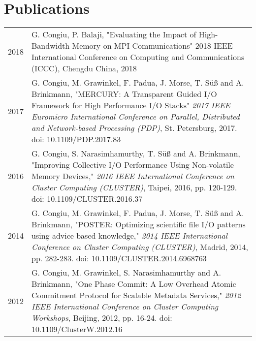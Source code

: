 \documentclass[a4paper,10pt]{article}
\begin{document}
\section{Publications}
\begin{tabular}{rp{11cm}}
        2018 & G. Congiu, P. Balaji, "Evaluating the Impact of High-Bandwidth Memory on MPI %
        Communications" 2018 IEEE International Conference on Computing and Communications (ICCC), %
        Chengdu China, 2018\\
        2017 & G. Congiu, M. Grawinkel, F. Padua, J. Morse, T. Süß and A. Brinkmann, "MERCURY: %
        A Transparent Guided I/O Framework for High Performance I/O Stacks" \textit{2017 IEEE %
        Euromicro International Conference on Parallel, Distributed and Network-based Processing (PDP)}, %
        St. Petersburg, 2017. doi: 10.1109/PDP.2017.83\\
        2016 & G. Congiu, S. Narasimhamurthy, T. Süß and A. Brinkmann, "Improving Collective %
        I/O Performance Using Non-volatile Memory Devices," \textit{2016 IEEE International Conference %
        on Cluster Computing (CLUSTER)}, Taipei, 2016, pp. 120-129. %
        doi: 10.1109/CLUSTER.2016.37\\
        2014 & G. Congiu, M. Grawinkel, F. Padua, J. Morse, T. Süß and A. Brinkmann, "POSTER: %
        Optimizing scientific file I/O patterns using advice based knowledge," \textit{2014 IEEE %
        International Conference on Cluster Computing (CLUSTER)}, Madrid, 2014, pp. 282-283. %
        doi: 10.1109/CLUSTER.2014.6968763\\
        2012 & G. Congiu, M. Grawinkel, S. Narasimhamurthy and A. Brinkmann, "One Phase Commit: %
        A Low Overhead Atomic Commitment Protocol for Scalable Metadata Services," \textit{2012 IEEE %
        International Conference on Cluster Computing Workshops}, Beijing, 2012, pp. 16-24. %
        doi: 10.1109/ClusterW.2012.16\\
\end{tabular}



\end{document}
